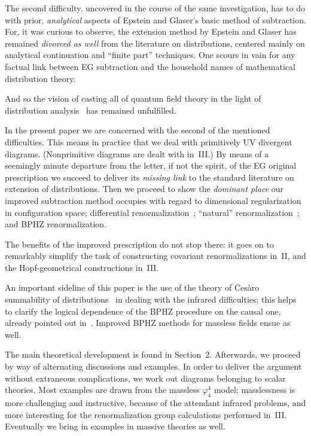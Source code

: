 \documentclass[a4paper,12pt]{article}
\newcommand{\7}{\dagger}           %
\theoremstyle{plain}
\theoremstyle{definition}
\begin{document}
The second difficulty, uncovered in the course of the same
investigation, has to do with prior, \textit{analytical} aspects of
Epstein and Glaser's basic method of subtraction. For, it was curious
to observe, the extension method by Epstein and Glaser has remained
\textit{divorced as well} from the literature on distributions,
centered mainly on analytical continuation and ``finite part''
techniques. One scours in vain for any factual link between EG
subtraction and the household names of mathematical distribution
theory.

And so the vision of casting all of quantum field theory in the light
of distribution analysis~\cite{Guetti,BP} has remained unfulfilled.

In the present paper we are concerned with the second of the mentioned
difficulties. This means in practice that we deal with primitively UV
divergent diagrams. (Nonprimitive diagrams are dealt with in~III.) By
means of a seemingly minute departure from the letter, if not the
spirit, of the EG original prescription we succeed to deliver its
\textit{missing link} to the standard literature on extension of
distributions. Then we proceed to show the \textit{dominant place} our
improved subtraction method occupies with regard to dimensional
regularization in configuration space; differential
renormalization~\cite{FJL}; ``natural'' renormalization~\cite{NR}; and
BPHZ renormalization.

The benefits of the improved prescription do not stop there: it goes
on to remarkably simplify the task of constructing covariant
renormalizations in~II, and the Hopf-geometrical constructions in~III.

An important sideline of this paper is the use of the theory of
Ces\`aro summability of distributions~\cite{Odysseus,CesarRicardo} in
dealing with the infrared difficulties; this helps to clarify the
logical dependence of the BPHZ procedure on the causal one, already
pointed out in~\cite{PrangeI}. Improved BPHZ methods for massless
fields ensue as well.

The main theoretical development is found in Section~2. Afterwards, we
proceed by way of alternating discussions and examples. In order to
deliver the argument without extraneous complications, we work out
diagrams belonging to scalar theories. Most examples are drawn from
the massless $\varphi^4_4$ model: masslessness is more challenging and
instructive, because of the attendant infrared problems, and more
interesting for the renormalization group calculations performed
in~III. Eventually we bring in examples in massive theories as well.
\end{document}
